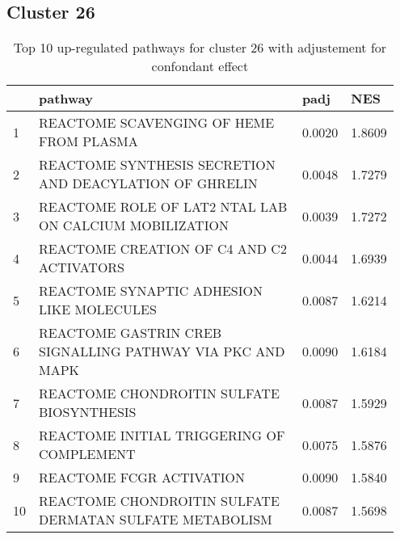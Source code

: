\documentclass{article}
\begin{document}
\subsection{Cluster 26 }
\begin{table}[H]
\centering
\begin{tabular}{p{0.05\linewidth}p{0.7\linewidth}p{0.1\linewidth}p{0.1\linewidth}}
  \hline
 & pathway & padj & NES \\ 
  \hline
1 & REACTOME SCAVENGING OF HEME FROM PLASMA & 0.0020 & 1.8609 \\ 
  2 & REACTOME SYNTHESIS SECRETION AND DEACYLATION OF GHRELIN & 0.0048 & 1.7279 \\ 
  3 & REACTOME ROLE OF LAT2 NTAL LAB ON CALCIUM MOBILIZATION & 0.0039 & 1.7272 \\ 
  4 & REACTOME CREATION OF C4 AND C2 ACTIVATORS & 0.0044 & 1.6939 \\ 
  5 & REACTOME SYNAPTIC ADHESION LIKE MOLECULES & 0.0087 & 1.6214 \\ 
  6 & REACTOME GASTRIN CREB SIGNALLING PATHWAY VIA PKC AND MAPK & 0.0090 & 1.6184 \\ 
  7 & REACTOME CHONDROITIN SULFATE BIOSYNTHESIS & 0.0087 & 1.5929 \\ 
  8 & REACTOME INITIAL TRIGGERING OF COMPLEMENT & 0.0075 & 1.5876 \\ 
  9 & REACTOME FCGR ACTIVATION & 0.0090 & 1.5840 \\ 
  10 & REACTOME CHONDROITIN SULFATE DERMATAN SULFATE METABOLISM & 0.0087 & 1.5698 \\ 
   \hline
\end{tabular}
\caption{Top 10 up-regulated pathways for cluster 26 with adjustement for confondant effect} 
\label{tab:q3_2_conf_26}
\end{table}
\end{document}
